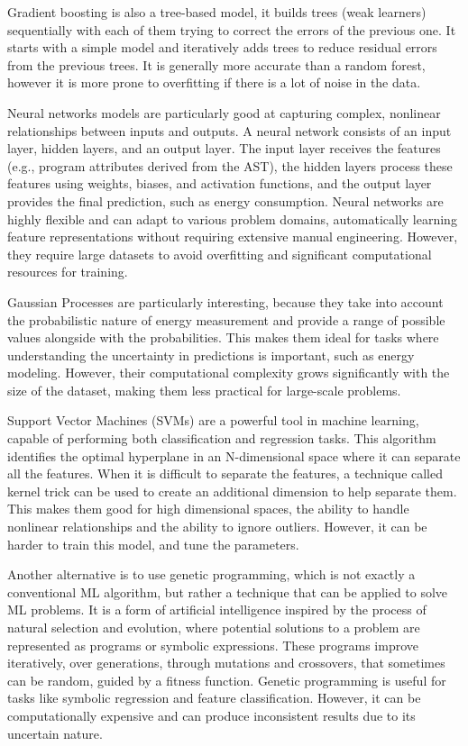 \documentclass[sigplan]{acmart}
\begin{document}
Gradient boosting is also a tree-based model, it builds trees (weak learners) sequentially with each of them trying to correct the errors of the previous one. It starts with a simple model and iteratively adds trees to reduce residual errors from the previous trees. It is generally more accurate than a random forest, however it is more prone to overfitting if there is a lot of noise in the data.

Neural networks models are particularly good at capturing complex, nonlinear relationships between inputs and outputs. A neural network consists of an input layer, hidden layers, and an output layer. The input layer receives the features (e.g., program attributes derived from the AST), the hidden layers process these features using weights, biases, and activation functions, and the output layer provides the final prediction, such as energy consumption. Neural networks are highly flexible and can adapt to various problem domains, automatically learning feature representations without requiring extensive manual engineering. However, they require large datasets to avoid overfitting and significant computational resources for training.

Gaussian Processes are particularly interesting, because they take into account the probabilistic nature of energy measurement and provide a range of possible values alongside with the probabilities. This makes them ideal for tasks where understanding the uncertainty in predictions is important, such as energy modeling. However, their computational complexity grows significantly with the size of the dataset, making them less practical for large-scale problems.

Support Vector Machines (SVMs) are a powerful tool in machine learning, capable of performing both classification and regression tasks. This algorithm identifies the optimal hyperplane in an N-dimensional space where it can separate all the features. When it is difficult to separate the features, a technique called kernel trick can be used to create an additional dimension to help separate them. This makes them good for high dimensional spaces, the ability to handle nonlinear relationships and the ability to ignore outliers. However, it can be harder to train this model, and tune the parameters.

Another alternative is to use genetic programming, which is not exactly a conventional ML algorithm, but rather a technique that can be applied to solve ML problems. It is a form of artificial intelligence inspired by the process of natural selection and evolution, where potential solutions to a problem are represented as programs or symbolic expressions. These programs improve iteratively, over generations, through mutations and crossovers, that sometimes can be random, guided by a fitness function. Genetic programming is useful for tasks like symbolic regression and feature classification. However, it can be computationally expensive and can produce inconsistent results due to its uncertain nature.
\end{document}

